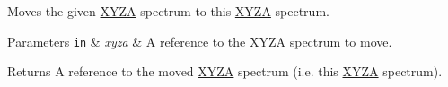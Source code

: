 Moves the given \hyperlink{structmage_1_1_x_y_z_a}{X\+Y\+ZA} spectrum to this \hyperlink{structmage_1_1_x_y_z_a}{X\+Y\+ZA} spectrum.


\begin{DoxyParams}[1]{Parameters}
\mbox{\tt in}  & {\em xyza} & A reference to the \hyperlink{structmage_1_1_x_y_z_a}{X\+Y\+ZA} spectrum to move. \\
\hline
\end{DoxyParams}
\begin{DoxyReturn}{Returns}
A reference to the moved \hyperlink{structmage_1_1_x_y_z_a}{X\+Y\+ZA} spectrum (i.\+e. this \hyperlink{structmage_1_1_x_y_z_a}{X\+Y\+ZA} spectrum). 
\end{DoxyReturn}
